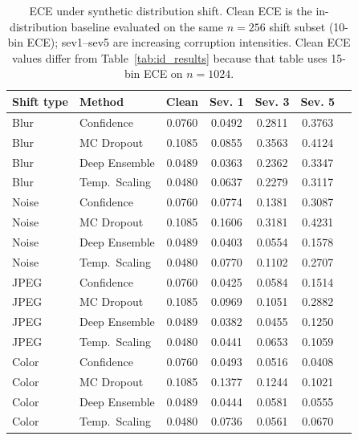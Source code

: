 \begin{table}[H]
    \centering
    \small
    \caption{ECE under synthetic distribution shift. Clean ECE is the in-distribution baseline evaluated on the same $n=256$ shift subset (10-bin ECE); sev1--sev5 are increasing corruption intensities. Clean ECE values differ from Table~\ref{tab:id_results} because that table uses 15-bin ECE on $n=1024$.}
    \label{tab:ece_shift}
    \begin{tabular}{llccccc}
        \toprule
        Shift type & Method & Clean & Sev. 1 & Sev. 3 & Sev. 5 \\
        \midrule
        Blur   & Confidence        & 0.0760 & 0.0492 & 0.2811 & 0.3763 \\
        Blur   & MC Dropout        & 0.1085 & 0.0855 & 0.3563 & 0.4124 \\
        Blur   & Deep Ensemble     & 0.0489 & 0.0363 & 0.2362 & 0.3347 \\
        Blur   & Temp.\ Scaling    & 0.0480 & 0.0637 & 0.2279 & 0.3117 \\
        \midrule
        Noise  & Confidence        & 0.0760 & 0.0774 & 0.1381 & 0.3087 \\
        Noise  & MC Dropout        & 0.1085 & 0.1606 & 0.3181 & 0.4231 \\
        Noise  & Deep Ensemble     & 0.0489 & 0.0403 & 0.0554 & 0.1578 \\
        Noise  & Temp.\ Scaling    & 0.0480 & 0.0770 & 0.1102 & 0.2707 \\
        \midrule
        JPEG   & Confidence        & 0.0760 & 0.0425 & 0.0584 & 0.1514 \\
        JPEG   & MC Dropout        & 0.1085 & 0.0969 & 0.1051 & 0.2882 \\
        JPEG   & Deep Ensemble     & 0.0489 & 0.0382 & 0.0455 & 0.1250 \\
        JPEG   & Temp.\ Scaling    & 0.0480 & 0.0441 & 0.0653 & 0.1059 \\
        \midrule
        Color  & Confidence        & 0.0760 & 0.0493 & 0.0516 & 0.0408 \\
        Color  & MC Dropout        & 0.1085 & 0.1377 & 0.1244 & 0.1021 \\
        Color  & Deep Ensemble     & 0.0489 & 0.0444 & 0.0581 & 0.0555 \\
        Color  & Temp.\ Scaling    & 0.0480 & 0.0736 & 0.0561 & 0.0670 \\
        \bottomrule
    \end{tabular}
\end{table}

